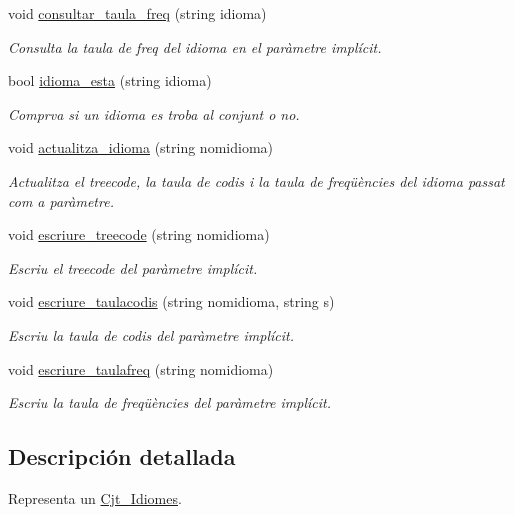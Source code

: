 \begin{DoxyCompactItemize}
void \hyperlink{class_cjt___idiomes_af0cfe6e69c1784af172fe825bdbe61f8}{consultar\+\_\+taula\+\_\+freq} (string idioma)
\begin{DoxyCompactList}\small\item\em Consulta la taula de freq del idioma en el paràmetre implícit. \end{DoxyCompactList}\item 
bool \hyperlink{class_cjt___idiomes_a4c46be5ecf3b12b3f481ace7d487fdc3}{idioma\+\_\+esta} (string idioma)
\begin{DoxyCompactList}\small\item\em Comprva si un idioma es troba al conjunt o no. \end{DoxyCompactList}\item 
void \hyperlink{class_cjt___idiomes_a7aad6974355b73c50c2d5c1edc0a5c14}{actualitza\+\_\+idioma} (string nomidioma)
\begin{DoxyCompactList}\small\item\em Actualitza el treecode, la taula de codis i la taula de freqüències del idioma passat com a paràmetre. \end{DoxyCompactList}\item 
void \hyperlink{class_cjt___idiomes_a49666adf7e2a9cefc96d4b7b3d925710}{escriure\+\_\+treecode} (string nomidioma)
\begin{DoxyCompactList}\small\item\em Escriu el treecode del paràmetre implícit. \end{DoxyCompactList}\item 
void \hyperlink{class_cjt___idiomes_afdad5e96949152abf75a9598224be426}{escriure\+\_\+taulacodis} (string nomidioma, string s)
\begin{DoxyCompactList}\small\item\em Escriu la taula de codis del paràmetre implícit. \end{DoxyCompactList}\item 
void \hyperlink{class_cjt___idiomes_a98862ab41b59ac71eca4408e2b6bf6f0}{escriure\+\_\+taulafreq} (string nomidioma)
\begin{DoxyCompactList}\small\item\em Escriu la taula de freqüències del paràmetre implícit. \end{DoxyCompactList}\end{DoxyCompactItemize}


\subsection{Descripción detallada}
Representa un \hyperlink{class_cjt___idiomes}{Cjt\+\_\+\+Idiomes}. 

